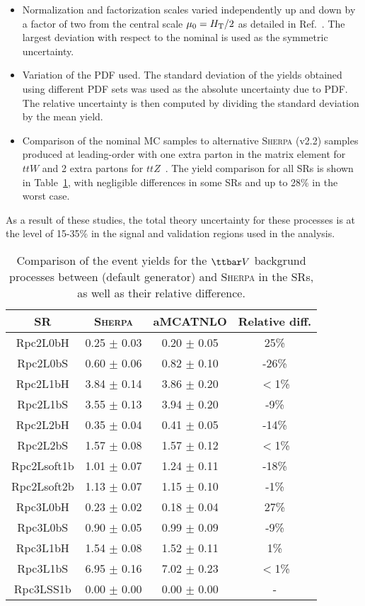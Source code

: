 \begin{itemize}
\item Normalization and factorization scales varied independently up and down by a factor of two from the central scale $\mu_0 = H_{\rm T}/2$ as detailed in Ref.~\cite{ATL-PHYS-PUB-2016-005}. 
The largest deviation with respect to the nominal is used as the symmetric uncertainty.
\item Variation of the PDF used.
The standard deviation of the yields obtained using different PDF sets was used as the absolute uncertainty due to PDF. 
The relative uncertainty is then computed by dividing the standard deviation by the mean yield.
\item Comparison of the nominal \AMCATNLO MC samples to alternative \textsc{Sherpa} (v2.2) samples produced at leading-order with one extra parton in the matrix element for $ttW$ and 2 extra partons 
for $ttZ$~\cite{ATL-PHYS-PUB-2016-005}. 
The yield comparison for all SRs is shown in Table~\ref{tab:ttVGenComp}, with negligible differences in some SRs and up to 28\% in the worst case.
\end{itemize}
As a result of these studies, the total theory uncertainty for these processes 
is at the level of 15-35\% in the signal and validation regions used in the 
analysis. 
\begin{table}[!htb]
\caption{Comparison of the event yields for the $\ttbar V$ backgrund processes between \AMCATNLO (default generator) and \textsc{Sherpa} in the SRs, as well as their relative difference.
}
\label{tab:ttVGenComp}
\def\arraystretch{1.1}
\centering
\begin{tabular}{|c|c|c|c|}
\hline\hline
   SR    & \textsc{Sherpa} & aMCATNLO & Relative diff.\\ \hline
Rpc2L0bH   &   0.25 $\pm$ 0.03   &   0.20 $\pm$ 0.05   &   25\% \\
Rpc2L0bS   &   0.60 $\pm$ 0.06   &   0.82 $\pm$ 0.10   &   -26\% \\
Rpc2L1bH   &   3.84 $\pm$ 0.14   &   3.86 $\pm$ 0.20   &   $<$1\% \\
Rpc2L1bS   &   3.55 $\pm$ 0.13   &   3.94 $\pm$ 0.20   &   -9\% \\
Rpc2L2bH   &   0.35 $\pm$ 0.04   &   0.41 $\pm$ 0.05   &   -14\% \\
Rpc2L2bS   &   1.57 $\pm$ 0.08   &   1.57 $\pm$ 0.12   &   $<$1\% \\
Rpc2Lsoft1b   &   1.01 $\pm$ 0.07   &   1.24 $\pm$ 0.11   &   -18\% \\
Rpc2Lsoft2b   &   1.13 $\pm$ 0.07   &   1.15 $\pm$ 0.10   &   -1\% \\
Rpc3L0bH   &   0.23 $\pm$ 0.02   &   0.18 $\pm$ 0.04   &   27\% \\
Rpc3L0bS   &   0.90 $\pm$ 0.05   &   0.99 $\pm$ 0.09   &   -9\% \\
Rpc3L1bH   &   1.54 $\pm$ 0.08   &   1.52 $\pm$ 0.11   &   1\% \\
Rpc3L1bS   &   6.95 $\pm$ 0.16   &   7.02 $\pm$ 0.23   &   $<$1\% \\
Rpc3LSS1b   &   0.00 $\pm$ 0.00   &   0.00 $\pm$ 0.00   &   - \\
\hline\hline
\end{tabular}
\end{table}


